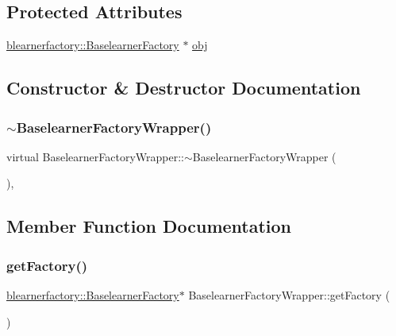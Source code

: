 \subsection*{Protected Attributes}
\begin{DoxyCompactItemize}
\item 
\mbox{\hyperlink{classblearnerfactory_1_1_baselearner_factory}{blearnerfactory\+::\+Baselearner\+Factory}} $\ast$ \mbox{\hyperlink{class_baselearner_factory_wrapper_a6dc7067dc7a33b29e81bb527b1acfb23}{obj}}
\end{DoxyCompactItemize}


\subsection{Constructor \& Destructor Documentation}
\mbox{\label{class_baselearner_factory_wrapper_a3c8ce56cb52b424af5369a7e3945b937}} 
\subsubsection{\texorpdfstring{$\sim$\+Baselearner\+Factory\+Wrapper()}{~BaselearnerFactoryWrapper()}}
{\footnotesize\ttfamily virtual Baselearner\+Factory\+Wrapper\+::$\sim$\+Baselearner\+Factory\+Wrapper (\begin{DoxyParamCaption}{ }\end{DoxyParamCaption})\hspace{0.3cm}{\ttfamily [inline]}, {\ttfamily [virtual]}}



\subsection{Member Function Documentation}
\mbox{\label{class_baselearner_factory_wrapper_ac32811bfb4833aab5d11c7c303070485}} 
\subsubsection{\texorpdfstring{get\+Factory()}{getFactory()}}
{\footnotesize\ttfamily \mbox{\hyperlink{classblearnerfactory_1_1_baselearner_factory}{blearnerfactory\+::\+Baselearner\+Factory}}$\ast$ Baselearner\+Factory\+Wrapper\+::get\+Factory (\begin{DoxyParamCaption}{ }\end{DoxyParamCaption})\hspace{0.3cm}{\ttfamily [inline]}}

